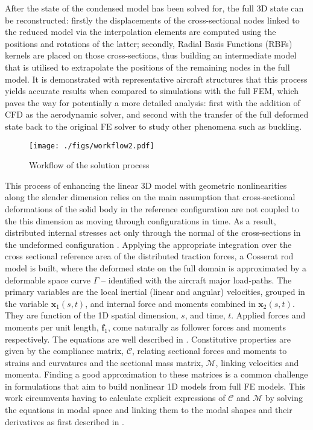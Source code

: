 \documentclass[11pt]{article}
\begin{document}
After the state of the condensed model has been solved for, the full 3D state can be reconstructed: firstly the displacements of the cross-sectional nodes linked to the reduced model via the interpolation elements are computed using the positions and rotations of the latter; secondly, Radial Basis Functions (RBFs) kernels are placed on those cross-sections, thus building an intermediate model that is utilised to extrapolate the positions of the remaining nodes in the full model. It is demonstrated with representative aircraft structures that this process yields accurate results when compared to simulations with the full FEM, which paves the way for potentially a more detailed analysis: first with the addition of CFD as the aerodynamic solver, and second with the transfer of the full deformed state back to the original FE solver to study other phenomena such as buckling. 

\begin{figure}[htbp]
\centering
\texttt{[image: ./figs/workflow2.pdf]}
\caption{\label{fig:org4803a6a}Workflow of the solution process}
\end{figure}

This process of enhancing the linear 3D model with geometric nonlinearities along the slender dimension relies on the main assumption that cross-sectional deformations of the solid body in the reference configuration are not coupled to the this dimension as moving through configurations in time. As a result, distributed internal stresses act only through the normal of the cross-sections in the undeformed configuration \cite{CEA2021a}.
Applying the appropriate integration over the cross sectional reference area of the distributed traction forces, a Cosserat rod model is built, where the deformed state on the full domain is approximated by a deformable space curve \(\Gamma\) -- identified with the aircraft major load-paths. The primary variables  are the local inertial (linear and angular) velocities, grouped in the variable \(\bm{x}_1(s, t)\), and internal force and moments combined in \(\bm{x}_2(s, t)\). They are function of the 1D spatial dimension, \(s\), and time, \(t\). 
Applied forces and moments per unit length, \(\bm{f}_1\), come naturally as follower forces and moments respectively. The equations are well described in \cite[Ch. 8]{PALACIOS2023}.
Constitutive properties are given by the compliance matrix, \(\bm{\mathcal{C}}\), relating sectional forces and moments to strains and curvatures and the sectional mass matrix, \(\bm{\mathcal{M}}\), linking velocities and momenta. Finding a good approximation to these matrices is a common challenge in formulations that aim to build nonlinear 1D models from full FE models. This work circumvents having to calculate explicit expressions of \(\bm{\mathcal{C}}\) and \(\bm{\mathcal{M}}\) by solving the equations in modal space and linking them to the modal shapes and their derivatives as first described in \cite{PALACIOS2012}.
\end{document}
